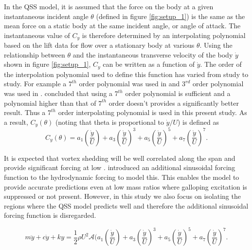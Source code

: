 In the QSS model, it is assumed that the force on the body at a given instantaneous incident angle $\theta$ (defined in figure \ref{fig:setup_1}) is the same as the mean force on a static body at the same incident angle, or angle of attack. The instantaneous value of $C_y$ is therefore determined by an interpolating polynomial based on the lift data for flow over a stationary body at various $\theta$. Using the relationship between $\theta$ and the instantaneous transverse velocity of the body $\dot{y}$ shown in figure \ref{fig:setup_1}, $C_y$ can be written as a function of $\dot{y}$. The order of the interpolation polynomial used to define this function has varied from study to study. For  example a $7^{th}$ order polynomial was used in \cite{Parkinson1964} and $3^{rd}$ order polynomial was used in \cite{Barrero-Gil2009}. \cite{Ng2005} concluded that using a $7^{th}$ order polynomial is sufficient and a polynomial higher than that of $7^{th}$ order doesn't provides a significantly better result. Thus a $7 ^{th}$ order interpolating polynomial is used in this present study. As a result, $C_y(\theta)$ (noting that theta is proportional to $\dot{y}/U$) is defined as
\begin{equation}
\label{cy ploynomial}
C_y(\theta)=a_1\left(\frac{\dot{y}}{U}\right)+a_3\left(\frac{\dot{y}}{U}\right)^3+a_5\left(\frac{\dot{y}}{U}\right)^5+a_7\left(\frac{\dot{y}}{U}\right)^7.
\end{equation}


 It is expected that vortex shedding will be well correlated along the span and provide significant forcing at low \reynoldsnumber. \citet{Joly2012} introduced  an additional sinusoidal forcing function to the hydrodynamic forcing to model this. This enables the model to provide accurate predictions even at low mass ratios where galloping excitation is suppressed or not present. However, in this study we also focus on isolating the regions where the QSS model predicts well and therefore the additional sinusoidal forcing function is disregarded.  
 
 
 
\begin{equation}
\label{final_equation_motion}
m\ddot{y}{+}c\dot{y}{+}ky{=}\frac{1}{2}\rho U^2 \mathcal {A} \Bigg(a_1\left(\frac{\dot{y}}{U}\right){+}a_3\left(\frac{\dot{y}}{U}\right)^3{+}a_5\left(\frac{\dot{y}}{U}\right)^5{+}a_7\left(\frac{\dot{y}}{U}\right)^7.
\end{equation}

